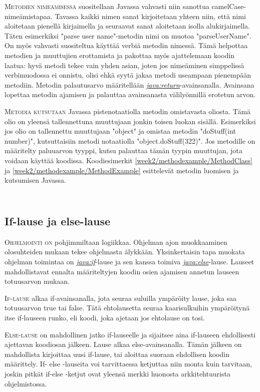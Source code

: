 \documentclass[openany]{book}
\newcommand{\newthought}[1]{\smallskip\textsc{#1}}
\newcommand{\java}[1]{\underline{\gls{java:#1}}}
\newcommand{\newjava}[1]{\textit{\java{#1}}}
\newcommand{\code}[3]{
	\begin{listing}
		\linespread{0.85}
		\inputminted{java}{OhjelmointiopasEsimerkit/src/#1/#2.java}
		\caption{#1: #3}
		\label{#1/#2}
	\end{listing}
}
\begin{document}
\newthought{Metodien nimeämisessä} suositellaan Javassa vahvasti niin sanottua 
camelCase-nimeämistapaa. Tavassa kaikki nimen sanat kirjoitetaan yhteen niin, että nimi aloitetaan
pienellä kirjaimella ja seuraavat sanat aloitetaan isolla alukirjaimella. Täten esimerkiksi
"parse user name"-metodin nimi on muotoa "parseUserName". On myös vahvasti suositeltua käyttää
verbiä metodin nimessä. Tämä helpottaa metodien ja muuttujien erottamista ja pakottaa
myös ajattelemaan koodin laatua: hyvä metodi tekee vain yhden asian, joten jos nimeäminen
simppelissä verbimuodossa ei onnistu, olisi ehkä syytä jakaa metodi useampaan pienempään
metodiin. Metodin palautusarvo määritellään \newjava{return}-avainsanalla. Avainsana lopettaa
metodin ajamisen ja palauttaa avainsanasta välilyönnillä erotetun arvon.

\newthought{Metodia kutsutaan} Javassa pistenotaatiolla metodin omistavasta oliosta. Tämä
olio on yleensä tallennettuna muuttujaan jonkin toisen luokan sisällä. Esimerkiksi jos olio
on tallennettu muuttujaan "object" ja omistaa metodin "doStuff(int number)", kutsuttaisiin
metodi notaatiolla "object.doStuff(322)". Jos metodille on määritelty paluuarvon tyyppi, kutsu
palauttaa tämän tyypin muuttujan, jota voidaan käyttää koodissa. Koodiesimerkit
\ref{week2/methodexample/MethodClass} ja \ref{week2/methodexample/MethodExample} esittelevät
metodin luomisen ja kutsumisen Javassa.

\code{week2/methodexample}{MethodClass}{Metodin luominen Javassa}
\code{week2/methodexample}{MethodExample}{Metodin kutsuminen Javassa}

\subsection{If-lause ja else-lause}
\label{if else}

\newthought{Ohjelmointi on} pohjimmiltaan logiikkaa. Ohjelman ajon muokkaaminen olosuhteiden
mukaan tekee ohjelmasta älykkään. Yksinkertaisin tapa muokata ohjelman toimintaa on
\newjava{if}-lause ja sen kanssa toimiva \newjava{else}-lause. Lauseet mahdollistavat ennalta
määriteltyjen koodin osien ajamisen annetun lauseen totuusarvon mukaan.

\newthought{If-lause} alkaa if-avainsanalla, jota seuraa suluilla ympäröity lause, joka saa
totuusarvon true tai false. Tätä ehtolausetta seuraa kaarisulkuihin ympäröitynä itse if-lauseen
runko, eli koodi, joka ajetaan jos ehtolause on tosi.

\newthought{Else-lause} on mahdollinen jatko if-lauseelle ja sijaitsee aina if-lauseen
ehdollisesti ajettavan koodiosan jälkeen. Lause alkaa else-avainsanalla. Tämän jälkeen on
mahdollista kirjoittaa uusi if-lause, tai aloittaa suoraan ehdollisen koodin määrittely. If-
else -lauseita voi tarvittaessa ketjuttaa niin monta kuin tarvitaan, joskin pitkät if-else
-ketjut ovat yleensä merkki huonosta arkkitehtuurista ohjelmistossa.
\end{document}
